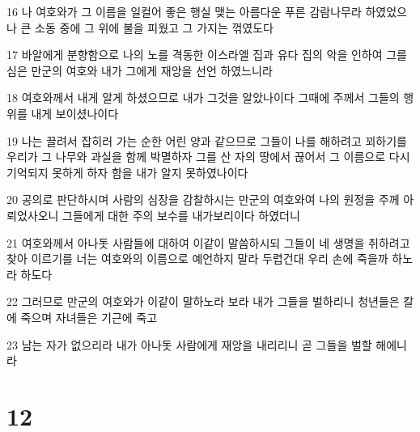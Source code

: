 \par 16 나 여호와가 그 이름을 일컬어 좋은 행실 맺는 아름다운 푸른 감람나무라 하였었으나 큰 소동 중에 그 위에 불을 피웠고 그 가지는 꺾였도다
\par 17 바알에게 분향함으로 나의 노를 격동한 이스라엘 집과 유다 집의 악을 인하여 그를 심은 만군의 여호와 내가 그에게 재앙을 선언 하였느니라
\par 18 여호와께서 내게 알게 하셨으므로 내가 그것을 알았나이다 그때에 주께서 그들의 행위를 내게 보이셨나이다
\par 19 나는 끌려서 잡히러 가는 순한 어린 양과 같으므로 그들이 나를 해하려고 꾀하기를 우리가 그 나무와 과실을 함께 박멸하자 그를 산 자의 땅에서 끊어서 그 이름으로 다시 기억되지 못하게 하자 함을 내가 알지 못하였나이다
\par 20 공의로 판단하시며 사람의 심장을 감찰하시는 만군의 여호와여 나의 원정을 주께 아뢰었사오니 그들에게 대한 주의 보수를 내가보리이다 하였더니
\par 21 여호와께서 아나돗 사람들에 대하여 이같이 말씀하시되 그들이 네 생명을 취하려고 찾아 이르기를 너는 여호와의 이름으로 예언하지 말라 두렵건대 우리 손에 죽을까 하노라 하도다
\par 22 그러므로 만군의 여호와가 이같이 말하노라 보라 내가 그들을 벌하리니 청년들은 칼에 죽으며 자녀들은 기근에 죽고
\par 23 남는 자가 없으리라 내가 아나돗 사람에게 재앙을 내리리니 곧 그들을 벌할 해에니라

\chapter{12}

